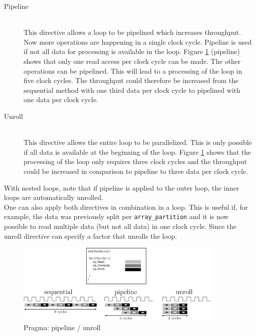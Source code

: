\begin{description}
\item[Pipeline]\hfill \\
This directive allows a loop to be pipelined which increases throughput.
Now more operations are happening in a single clock cycle.
Pipeline is used if not all data for processing is available in the loop. Figure
\ref{fig:p_pipeline_unroll} (pipeline) shows that only one read access per clock cycle can be made. The other operations can be pipelined. This will lead to a processing of the loop in five clock cycles. The throughput could therefore be increased from the sequential method with one third data per clock cycle to pipelined with one data per clock cycle.

\item[Unroll]\hfill \\ 
This directive allows the entire loop to be parallelized. This is only possible if all data is available at the beginning of the loop. Figure \ref{fig:p_pipeline_unroll} shows that the processing of the loop only requires three clock cycles and the throughput could be increased in comparison to pipeline to three data per clock cycle.
\end{description}

With nested loops, note that if pipeline is applied to the outer loop, the inner
loops are automatically unrolled. \\
One can also apply both directives in combination in a loop. This is useful if,
for example, the data was previously split per \texttt{array\_partition} and it is now possible to read multiple data (but not all data) in one clock cycle. Since the unroll directive can specify a factor that unrolls the loop.

\begin{figure}[h!]
    \centering
    \includegraphics[width=0.9\textwidth]{images/theory/pipeline_unroll.png}
    \caption{Pragma: pipeline / unroll}
    \label{fig:p_pipeline_unroll}
\end{figure}

